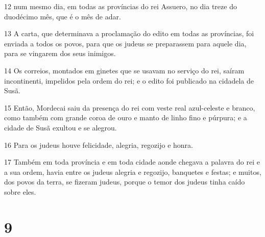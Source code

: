 \par 12 num mesmo dia, em todas as províncias do rei Assuero, no dia treze do duodécimo mês, que é o mês de adar.
\par 13 A carta, que determinava a proclamação do edito em todas as províncias, foi enviada a todos os povos, para que os judeus se preparassem para aquele dia, para se vingarem dos seus inimigos.
\par 14 Os correios, montados em ginetes que se usavam no serviço do rei, saíram incontinenti, impelidos pela ordem do rei; e o edito foi publicado na cidadela de Susã.
\par 15 Então, Mordecai saiu da presença do rei com veste real azul-celeste e branco, como também com grande coroa de ouro e manto de linho fino e púrpura; e a cidade de Susã exultou e se alegrou.
\par 16 Para os judeus houve felicidade, alegria, regozijo e honra.
\par 17 Também em toda província e em toda cidade aonde chegava a palavra do rei e a sua ordem, havia entre os judeus alegria e regozijo, banquetes e festas; e muitos, dos povos da terra, se fizeram judeus, porque o temor dos judeus tinha caído sobre eles.

\chapter{9}

